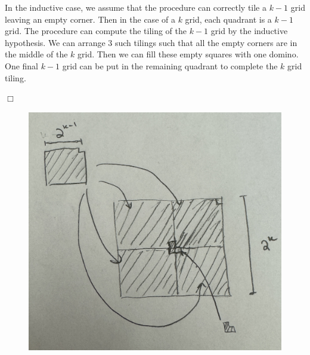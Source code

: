 \documentclass[10pt]{article}
\newenvironment{proof}{\par\noindent{\it Proof.}\hspace*{1em}}{$\Box$\bigskip}
\begin{document}
\begin{solution}
\begin{enumerate}[(a)]
{\begin{proof}
                In the inductive case, we assume that the procedure can correctly tile a $k-1$ grid leaving an empty corner. 
                Then in the case of a $k$ grid, each quadrant is a $k-1$ grid. 
                The procedure can compute the tiling of the $k-1$ grid by the inductive hypothesis. 
                We can arrange $3$ such tilings such that all the empty corners are in the middle of the $k$ grid. 
                Then we can fill these empty squares with one domino. 
                One final $k-1$ grid can be put in the remaining quadrant to complete the $k$ grid tiling. 
                
            \end{proof}
            \begin{figure}[H]
                \centering
                \includegraphics[scale=0.5]{3c.JPG}
            \end{figure}
        }

    \end{enumerate}

\end{solution}

\newpage
\end{document}
